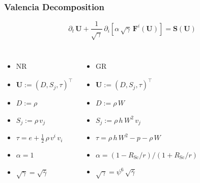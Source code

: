 \documentclass{beamer}
\newcommand{\p}{\partial}
\newcommand{\bs}{\boldsymbol}
\newcommand{\rsc}{R_{\mathrm{Sc}}}
\begin{document}
\begin{frame}
\frametitle{Valencia Decomposition}

  \begin{equation*}
    \p_{t}\,\bs{U}
    +\frac{1}{\sqrt{\gamma}}\,
    \p_{i}\left[\alpha\,\sqrt{\gamma}\,\bs{F}^{i}\left(\bs{U}\right)\right]
    =\bs{S}\left(\bs{U}\right)
  \end{equation*}

  \begin{columns}[c]


      \begin{itemize}[<+->]
        \item[]
          NR
        \item[]
          $\bs{U}:=\left(D,S_{j},\tau\right)^{\top}$
        \item[]
          $D:=\rho$
        \item[]
          $S_{j}:=\rho\,v_{j}$
        \item[]
          $\tau=e+\frac{1}{2}\,\rho\,v^{i}\,v_{i}$
        \item[]
          $\alpha=1$
        \item[]
          $\sqrt{\gamma}=\sqrt{\bar{\gamma}}$
      \end{itemize}


      \begin{itemize}[<+->]
        \item[]
          GR
        \item[]
          $\bs{U}:=\left(D,S_{j},\tau\right)^{\top}$
        \item[]
          $D:=\rho\,W$
        \item[]
          $S_{j}:=\rho\,h\,W^{2}\,v_{j}$
        \item[]
          $\tau=\rho\,h\,W^{2}-p-\rho\,W$
        \item[]
          $\alpha=\left(1-\rsc/r\right)/\left(1+\rsc/r\right)$
        \item[]
          $\sqrt{\gamma}=\psi^{6}\,\sqrt{\bar{\gamma}}$
      \end{itemize}

  \end{columns}

\end{frame}
\end{document}
